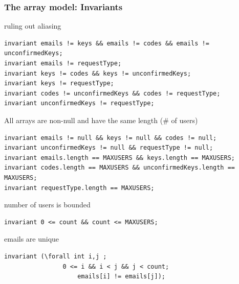 \documentclass{beamer}
\begin{document}
\begin{frame}[fragile]
    \frametitle{The array model: Invariants}
    
  \begin{block}{\small ruling out aliasing}
    \begin{lstlisting}
invariant emails != keys && emails != codes && emails != unconfirmedKeys;
invariant emails != requestType;
invariant keys != codes && keys != unconfirmedKeys;
invariant keys != requestType;
invariant codes != unconfirmedKeys && codes != requestType;
invariant unconfirmedKeys != requestType;\end{lstlisting}
  \end{block}
  \vspace{-1em}
  \begin{block}{\small All arrays are non-null and have the same length (\# of users)}
\begin{lstlisting}
invariant emails != null && keys != null && codes != null;
invariant unconfirmedKeys != null && requestType != null;
invariant emails.length == MAXUSERS && keys.length == MAXUSERS;
invariant codes.length == MAXUSERS && unconfirmedKeys.length == MAXUSERS;
invariant requestType.length == MAXUSERS;\end{lstlisting}
  \end{block}
  \vspace{-1em}
  \begin{block}{\small number of users is bounded}
\begin{lstlisting}
invariant 0 <= count && count <= MAXUSERS;\end{lstlisting}
  \end{block}
  \vspace{-1em}
\begin{block}{\small emails are unique}
\begin{lstlisting}  
invariant (\forall int i,j ; 
                0 <= i && i < j && j < count; 
                    emails[i] != emails[j]);\end{lstlisting}
  \end{block}
\end{frame}
\end{document}
